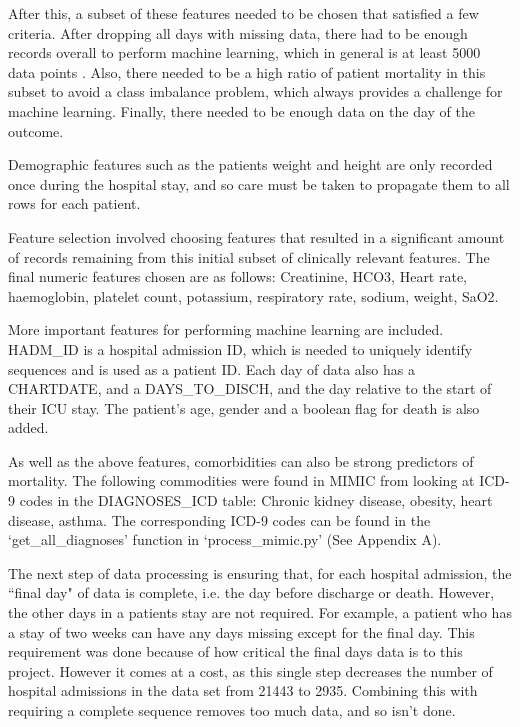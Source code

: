 \documentclass[12pt]{article}
\begin{document}
After this, a subset of these features needed to be chosen that satisfied a few criteria. After dropping all days with missing data, there had to be enough records overall to perform machine learning, which in general is at least 5000 data points \cite{5000Points}. Also, there needed to be a high ratio of patient mortality in this subset to avoid a class imbalance problem, which always provides a challenge for machine learning. Finally, there needed to be enough data on the day of the outcome.

Demographic features such as the patients weight and height are only recorded once during the hospital stay, and so care must be taken to propagate them to all rows for each patient.

Feature selection involved choosing features that resulted in a significant amount of records remaining from this initial subset of clinically relevant features. The final numeric features chosen are as follows: Creatinine, HCO3, Heart rate, haemoglobin, platelet count, potassium, respiratory rate, sodium, weight, SaO2. 

More important features for performing machine learning are included. HADM\_ID is a hospital admission ID, which is needed to uniquely identify sequences and is used as a patient ID. Each day of data also has a CHARTDATE, and a DAYS\_TO\_DISCH, and the day relative to the start of their ICU stay. The patient's age, gender and a boolean flag for death is also added.

As well as the above features, comorbidities can also be strong predictors of mortality. The following commodities were found in MIMIC from looking at ICD-9 codes in the DIAGNOSES\_ICD table: Chronic kidney disease, obesity, heart disease, asthma. The corresponding ICD-9 codes can be found in the `get\_all\_diagnoses' function in `process\_mimic.py' (See Appendix A). 

The next step of data processing is ensuring that, for each hospital admission, the ``final day" of data is complete, i.e. the day before discharge or death. However, the other days in a patients stay are not required. For example, a patient who has a stay of two weeks can have any days missing except for the final day. This requirement was done because of how critical the final days data is to this project. However it comes at a cost, as this single step decreases the number of hospital admissions in the data set from 21443 to 2935. Combining this with requiring a complete sequence removes too much data, and so isn't done. 
\end{document}
